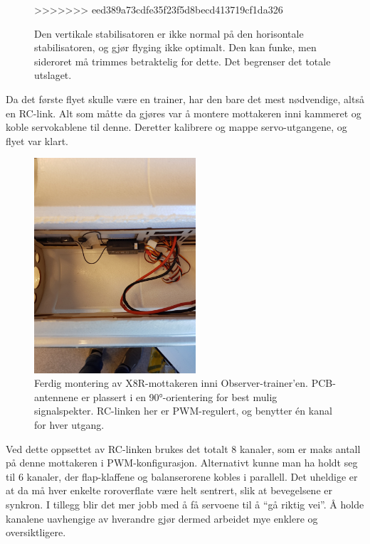 \documentclass[12pt, a4paper]{article}
\begin{document}
\begin{figure}[ht]
	\caption[Skjev stabilisator]{Den vertikale stabilisatoren er ikke normal på den horisontale stabilisatoren, og gjør flyging ikke optimalt. Den kan funke, men sideroret må trimmes betraktelig for dette. Det begrenser det totale utslaget.}
>>>>>>> eed389a73cdfe35f23f5d8becd413719cf1da326
\end{figure}

Da det første flyet skulle være en trainer, har den bare det mest nødvendige, altså en RC-link. Alt som måtte da gjøres var å montere mottakeren inni kammeret og koble servokablene til denne. Deretter kalibrere og mappe servo-utgangene, og flyet var klart.

\begin{figure}[ht]
	\centering
	\includegraphics[height=8cm, width = .6\textwidth]{bilder/mottakermontering.jpg}
	\caption[Mottaker-montering]{Ferdig montering av X8R-mottakeren inni Observer-trainer'en. PCB-antennene er plassert i en \ang{90}-orientering for best mulig signalspekter. RC-linken her er PWM-regulert, og benytter én kanal for hver utgang.}
\end{figure}
\newpage

Ved dette oppsettet av RC-linken brukes det totalt 8 kanaler, som er maks antall på denne mottakeren i PWM-konfigurasjon. Alternativt kunne man ha holdt seg til 6 kanaler, der flap-klaffene og balanserorene kobles i parallell. Det uheldige er at da må hver enkelte roroverflate være helt sentrert, slik at bevegelsene er synkron. I tillegg blir det mer jobb med å få servoene til å ``gå riktig vei''. Å holde kanalene uavhengige av hverandre gjør dermed arbeidet mye enklere og oversiktligere. 
\end{document}

